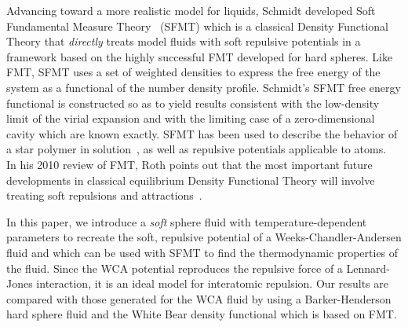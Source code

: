 \documentclass[letterpaper,twocolumn,amsmath,amssymb,prb]{revtex4-1}
\begin{document}
Advancing toward a more realistic model for liquids, Schmidt developed 
Soft Fundamental Measure Theory~\cite{schmidt1999density, schmidt2000fluid} (SFMT) 
which is a classical Density Functional 
Theory that \textit{directly} treats model fluids with
soft repulsive potentials in a framework
based on the highly successful FMT developed for hard spheres.
Like FMT, SFMT uses a set of weighted densities 
to express the free energy of the system
as a functional of the number density profile.
Schmidt's SFMT free energy functional is constructed so as to yield results 
consistent with the low-density limit of the virial expansion
and with the limiting case of a zero-dimensional cavity which are known 
exactly. 
%
%
%
SFMT has been used to describe the behavior of a star polymer in
solution~\cite{schmidt2000density, groh2001density, kim2001adsorption,
  sweatman2002fundamental}, as well as repulsive potentials applicable
to atoms.~\cite{sweatman2002fundamental, schmidt2000fluid}
%
In his 2010 review of FMT, Roth points out that the most important future
developments in classical equilibrium Density Functional Theory 
will involve treating soft repulsions and attractions~\cite{roth2010fundamental}.


In this paper, we introduce a \textit{soft} sphere fluid with 
temperature-dependent parameters to recreate the 
soft, repulsive potential of a Weeks-Chandler-Andersen fluid and which 
can be used with SFMT to find the thermodynamic properties of the fluid.
%
Since the WCA potential reproduces the repulsive force of a Lennard-Jones 
interaction, it is an ideal model for interatomic repulsion. 
Our results are compared with those generated for the WCA fluid by using 
a Barker-Henderson hard sphere fluid and the White Bear density 
functional which is based on FMT\cite{roth2002whitebear}.
\end{document}
